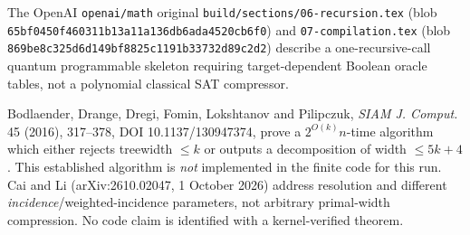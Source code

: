 \documentclass[11pt]{article}
\begin{document}
The OpenAI \texttt{openai/math} original \texttt{build/sections/06-recursion.tex} (blob \texttt{65bf0450f460311b13a11a136db6ada4520cb6f0}) and \texttt{07-compilation.tex} (blob \texttt{869be8c325d6d149bf8825c1191b33732d89c2d2}) describe a one-recursive-call quantum programmable skeleton requiring target-dependent Boolean oracle tables, not a polynomial classical SAT compressor.

Bodlaender, Drange, Dregi, Fomin, Lokshtanov and Pilipczuk, \emph{SIAM J. Comput.} 45 (2016), 317--378, DOI 10.1137/130947374, prove a $2^{O(k)}n$-time algorithm which either rejects treewidth $\le k$ or outputs a decomposition of width $\le5k+4$. This established algorithm is \emph{not} implemented in the finite code for this run. Cai and Li (arXiv:2610.02047, 1 October 2026) address resolution and different \emph{incidence}/weighted-incidence parameters, not arbitrary primal-width compression. No code claim is identified with a kernel-verified theorem.
\end{document}
